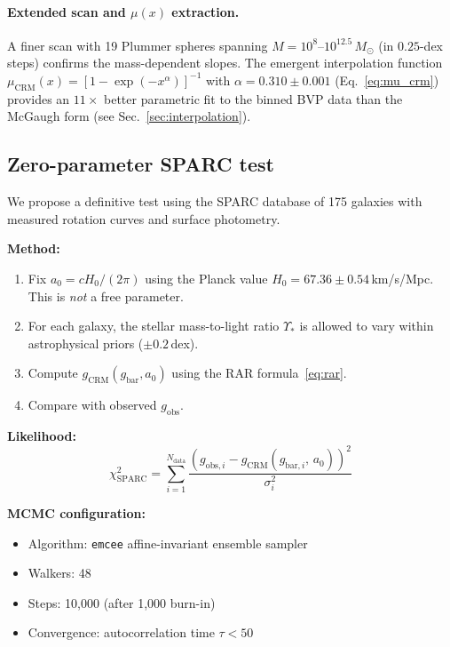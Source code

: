 \documentclass[aps,prd,twocolumn,superscriptaddress,nofootinbib]{revtex4-2}
\begin{document}
\paragraph{Extended scan and $\mu(x)$ extraction.}
A finer scan with 19 Plummer spheres spanning $M = 10^{8}$--$10^{12.5}\,M_\odot$ (in $0.25$-dex steps) confirms the mass-dependent slopes. The emergent interpolation function $\mu_{\mathrm{CRM}}(x) = [1 - \exp(-x^\alpha)]^{-1}$ with $\alpha = 0.310 \pm 0.001$ (Eq.~\ref{eq:mu_crm}) provides an $11\times$ better parametric fit to the binned BVP data than the McGaugh form (see Sec.~\ref{sec:interpolation}).

\subsection{Zero-parameter SPARC test}
\label{sec:mcmc}

We propose a definitive test using the SPARC database \cite{Lelli2016} of 175 galaxies with measured rotation curves and surface photometry.

\textbf{Method:}
\begin{enumerate}
\item Fix $a_0 = cH_0/(2\pi)$ using the Planck value $H_0 = 67.36 \pm 0.54$\,km/s/Mpc. This is \textit{not} a free parameter.
\item For each galaxy, the stellar mass-to-light ratio $\Upsilon_*$ is allowed to vary within astrophysical priors ($\pm 0.2$\,dex).
\item Compute $g_{\mathrm{CRM}}(g_{\mathrm{bar}}, a_0)$ using the RAR formula~\eqref{eq:rar}.
\item Compare with observed $g_{\mathrm{obs}}$.
\end{enumerate}

\textbf{Likelihood:}
\begin{equation}
\chi^2_{\mathrm{SPARC}} = \sum_{i=1}^{N_{\mathrm{data}}} \frac{\left(g_{\mathrm{obs},i} - g_{\mathrm{CRM}}(g_{\mathrm{bar},i},\, a_0)\right)^2}{\sigma_i^2}
\end{equation}

\textbf{MCMC configuration:}
\begin{itemize}
\item Algorithm: \texttt{emcee} affine-invariant ensemble sampler \cite{ForemanMackey2013}
\item Walkers: 48
\item Steps: 10,000 (after 1,000 burn-in)
\item Convergence: autocorrelation time $\tau < 50$
\end{itemize}
\end{document}
